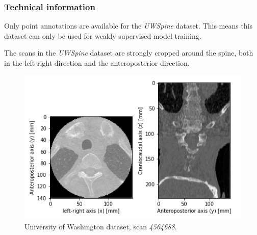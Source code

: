 \subsubsection{Technical information}

Only point annotations are available for the \textit{UWSpine} dataset. 
This means this dataset can only be used for weakly supervised model training.

The scans in the \textit{UWSpine} dataset are strongly cropped around the spine, both in the left-right direction and the anteroposterior direction.

\begin{figure}
    \centering
    \includegraphics[width=.95\textwidth]{automated_graphs/UW_4564688.png}
    \caption{University of Washington dataset, scan \textit{4564688}. \label{fig:UW_4564688}}
\end{figure}

